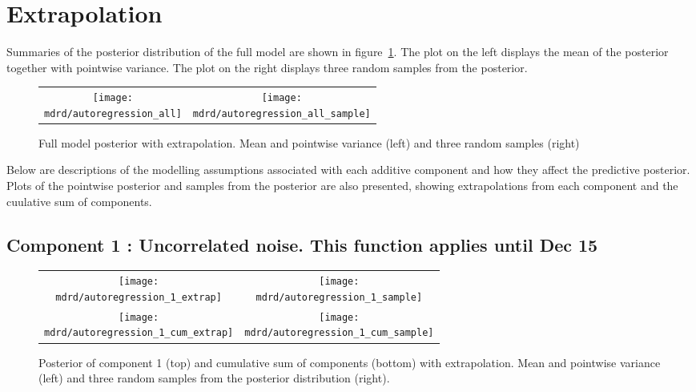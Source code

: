 \documentclass{article} %
\begin{document}
\section{Extrapolation}
\label{sec:extrap}

Summaries of the posterior distribution of the full model are shown in figure~\ref{fig:extrap}.
The plot on the left displays the mean of the posterior together with pointwise variance.
The plot on the right displays three random samples from the posterior.

\begin{figure}[H]
\newcommand{\wmgd}{0.5\columnwidth}
\newcommand{\hmgd}{3.0cm}
\newcommand{\mdrd}{autoregression}
\newcommand{\mbm}{\hspace{-0.3cm}}
\begin{tabular}{cc}
\mbm \texttt{[image: \\mdrd/autoregression\_all]} & \texttt{[image: \\mdrd/autoregression\_all\_sample]}
\end{tabular}
\caption{Full model posterior with extrapolation. Mean and pointwise variance (left) and three random samples (right)}
\label{fig:extrap}
\end{figure}

Below are descriptions of the modelling assumptions associated with each additive component and how they affect the predictive posterior.
Plots of the pointwise posterior and samples from the posterior are also presented, showing extrapolations from each component and the cuulative sum of components.

\subsection{Component 1 : Uncorrelated noise. This function applies until Dec   15}



\begin{figure}[H]
\newcommand{\wmgd}{0.5\columnwidth}
\newcommand{\hmgd}{3.0cm}
\newcommand{\mdrd}{autoregression}
\newcommand{\mbm}{\hspace{-0.3cm}}
\begin{tabular}{cc}
\mbm \texttt{[image: \\mdrd/autoregression\_1\_extrap]} & \texttt{[image: \\mdrd/autoregression\_1\_sample]} \\
\mbm \texttt{[image: \\mdrd/autoregression\_1\_cum\_extrap]} & \texttt{[image: \\mdrd/autoregression\_1\_cum\_sample]}
\end{tabular}
\caption{Posterior of component 1 (top) and cumulative sum of components (bottom) with extrapolation. Mean and pointwise variance (left) and three random samples from the posterior distribution (right).}
\label{fig:extrap1}
\end{figure}
\end{document}
